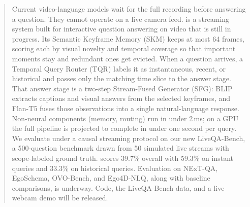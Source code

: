 \begin{abstract}
Current video-language models wait for the full recording before answering a question. They cannot operate on a live camera feed. \ours is a streaming system built for interactive question answering on video that is still in progress. Its Semantic Keyframe Memory (SKM) keeps at most 64 frames, scoring each by visual novelty and temporal coverage so that important moments stay and redundant ones get evicted. When a question arrives, a Temporal Query Router (TQR) labels it as instantaneous, recent, or historical and passes only the matching time slice to the answer stage. That answer stage is a two-step Stream-Fused Generator (SFG): BLIP extracts captions and visual answers from the selected keyframes, and Flan-T5 fuses those observations into a single natural-language response. Non-neural components (memory, routing) run in under 2\,ms; on a GPU the full pipeline is projected to complete in under one second per query. We evaluate under a causal streaming protocol on our new LiveQA-Bench, a 500-question benchmark drawn from 50 simulated live streams with scope-labeled ground truth. \ours scores 39.7\% overall with 59.3\% on instant queries and 33.3\% on historical queries. Evaluation on NExT-QA, EgoSchema, OVO-Bench, and Ego4D-NLQ, along with baseline comparisons, is underway. Code, the LiveQA-Bench data, and a live webcam demo will be released.
\end{abstract}
